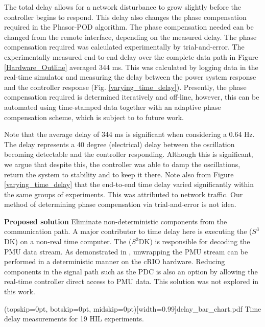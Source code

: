\documentclass{ieeeaccess}
\begin{document}
The total delay allows for a network disturbance to grow slightly before the controller begins to respond. This delay also changes the phase compensation required in the Phasor-POD algorithm. The phase compensation needed can be changed from the remote interface, depending on the measured delay. The phase compensation required was calculated experimentally by trial-and-error. The experimentally measured end-to-end delay over the complete data path in Figure \ref{Hardware_Outline} averaged 344 ms. This was calculated by logging data in the real-time simulator and measuring the delay between the power system response and the controller response (Fig. \ref{varying_time_delay}). Presently, the phase compensation required is determined iteratively and off-line, however, this can be automated using time-stamped data together with an adaptive phase compensation scheme, which is subject to to future work. 

Note that the average delay of 344 ms is significant when considering a 0.64 Hz. The delay represents a 40 degree (electrical) delay between the oscillation becoming detectable and the controller responding. Although this is significant, we argue that despite this, the controller was able to damp the oscillations, return the system to stability and to keep it there. Note also from Figure \ref{varying_time_delay} that the end-to-end time delay varied significantly within the same groups of experiments. This was attributed to network traffic. Our method of determining phase compensation via trial-and-error is not idea.

\textbf{Proposed solution} Eliminate non-deterministic components from the communication path. A major contributor to time delay here is executing the ($S^{3}$DK) on a non-real time computer. The ($S^{3}$DK) is responsible for decoding the PMU data stream. As demonstrated in \cite{Audur}, unwrapping the PMU stream can be performed in a deterministic manner on the cRIO hardware. Reducing components in the signal path such as the PDC is also an option by allowing the real-time controller direct access to PMU data. This solution was not explored in this work.

\Figure[tbph](topskip=0pt, botskip=0pt, midskip=0pt)[width=0.99\columnwidth]{delay_bar_chart.pdf}
{Time delay measurements for 19 HIL experiments.\label{varying_time_delay}}
\end{document}
